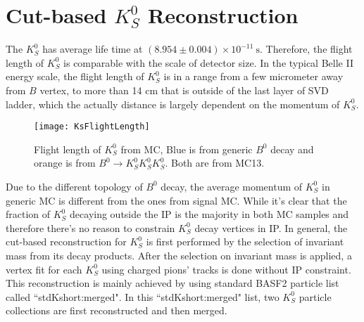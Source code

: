  \section{Cut-based $K_S^0$ Reconstruction}
 
 The $K_S^0$ has average life time at $(8.954 \pm 0.004) \times 10 ^{-11} \:\text{s}$. Therefore, the flight length of $K_S^0$ is comparable with the scale of detector size. In the typical Belle II energy scale, the flight length of $K_S^0$ is in a range from a few micrometer away from $B$ vertex, to more than 14 cm that is outside of the last layer of SVD ladder, which the actually distance is largely dependent on the momentum of $K_S^0$. 

 \begin{figure}[htpb]
 	\centering 
 	\texttt{[image: KsFlightLength]}
 	\caption{Flight length of $K_S^0$ from MC, Blue is from generic $B^0$ decay and  orange is from $B^0 \to K_S^0  K_S^0  K_S^0$. Both are from MC13.}
 \end{figure}
 
 Due to the different topology of $B^0$ decay, the average momentum of $K_S^0$ in generic MC is different from the ones from signal MC. While it's clear that the fraction of $K_S^0$ decaying outside the IP is the majority in both MC samples and therefore there's no reason to constrain $K_S^0$ decay vertices in IP. In general, the cut-based reconstruction for $K_S^0$ is first performed by the selection of invariant mass from its decay products. After the selection on invariant mass is applied, a vertex fit for each $K_S^0$ using charged pions' tracks is done without IP constraint. This reconstruction is mainly achieved by using standard BASF2 particle list called ``stdKshort:merged". In this ``stdKshort:merged" list, two $K_S^0$ particle collections are first reconstructed and then merged.
  
